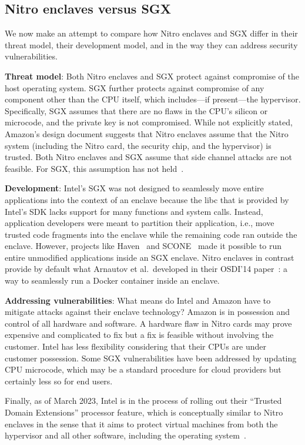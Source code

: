 \subsection{Nitro enclaves versus SGX}%
\label{sec:comparison}

We now make an attempt to compare how Nitro enclaves and SGX differ in their
threat model, their development model, and in the way they can address security
vulnerabilities.

\textbf{Threat model}:
Both Nitro enclaves and SGX protect against compromise of the host operating
system.  SGX further protects against compromise of any component other than the
CPU itself, which includes---if present---the hypervisor.  Specifically, SGX
assumes that there are no flaws in the CPU's silicon or microcode, and the
private key is not compromised.  While not explicitly stated, Amazon's design
document suggests that Nitro enclaves assume that the Nitro system (including
the Nitro card, the security chip, and the hypervisor) is trusted.  Both Nitro
enclaves and SGX assume that side channel attacks are not feasible.  For SGX,
this assumption has not held~\cite{Nilsson20a,Fei2021a}.

\textbf{Development}:
Intel's SGX was not designed to seamlessly move entire applications into the
context of an enclave because the libc that is provided by Intel's SDK lacks
support for many functions and system calls.  Instead, application developers
were meant to partition their application, i.e., move trusted code fragments
into the enclave while the remaining code ran outside the enclave.  However,
projects like Haven~\cite{Baumann2014a} and SCONE~\cite{Arnautov2016a} made it
possible to run entire unmodified applications inside an SGX enclave.  Nitro
enclaves in contrast provide by default what Arnautov et al.\ developed in their
OSDI'14 paper~\cite{Arnautov2016a}: a way to seamlessly run a Docker container
inside an enclave.

\textbf{Addressing vulnerabilities}:
What means do Intel and Amazon have to mitigate attacks against their enclave
technology?  Amazon is in possession and control of all hardware and software.
A hardware flaw in Nitro cards may prove expensive and complicated to fix but a
fix is feasible without involving the customer.  Intel has less flexibility
considering that their CPUs are under customer possession.  Some SGX
vulnerabilities have been addressed by updating CPU microcode, which may be a
standard procedure for cloud providers but certainly less so for end users.

Finally, as of March 2023, Intel is in the process of rolling out their
``Trusted Domain Extensions'' processor feature, which is conceptually similar
to Nitro enclaves in the sense that it aims to protect virtual machines from
both the hypervisor and all other software, including the operating
system~\cite{tdx}.
